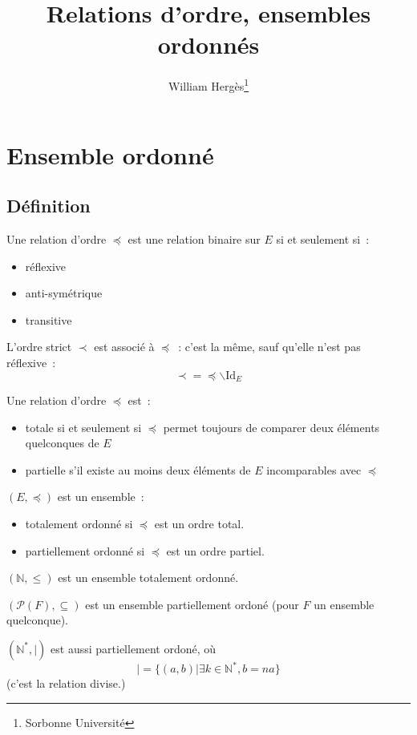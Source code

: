 \documentclass[a4paper, titlepage]{article}
\title{Relations d'ordre, ensembles ordonnés}
\author{William Hergès\thanks{Sorbonne Université}}
\begin{document}
	\maketitle
	\tableofcontents
	\newpage
    \section{Ensemble ordonné}
    \subsection{Définition}
    \begin{defn}
        Une relation d'ordre $\preceq$ est une relation binaire sur $E$ si et seulement si~:
        \begin{itemize}
            \item réflexive
            \item anti-symétrique
            \item transitive
        \end{itemize}

        L'ordre strict $\prec$ est associé à $\preceq$~: c'est la même, sauf qu'elle n'est pas réflexive~:
        $$ \prec = \preceq\backslash\mathrm{Id}_E $$
    \end{defn}
    \begin{defn}
        Une relation d'ordre $\preceq$ est~:
        \begin{itemize}
            \item totale si et seulement si $\preceq$ permet toujours de comparer deux éléments quelconques de $E$
            \item partielle s'il existe au moins deux éléments de $E$ incomparables avec $\preceq$
        \end{itemize}
    \end{defn}
    \begin{defn}
        $(E,\preceq)$ est un ensemble~:
        \begin{itemize}
            \item totalement ordonné si $\preceq$ est un ordre total.
            \item partiellement ordonné si $\preceq$ est un ordre partiel.
        \end{itemize}
    \end{defn}
    \begin{exemple}
        $(\mathbb{N},\leqslant )$ est un ensemble totalement ordonné.

        $(\mathcal{P}(F),\subseteq)$ est un ensemble partiellement ordoné (pour $F$ un ensemble quelconque).

        $(\mathbb{N}^*, |)$ est aussi partiellement ordoné, où
        $$ | = \{(a,b)|\exists k\in\mathbb{N}^*, b = na\} $$
        (c'est la relation divise.)
    \end{exemple}
\end{document}
